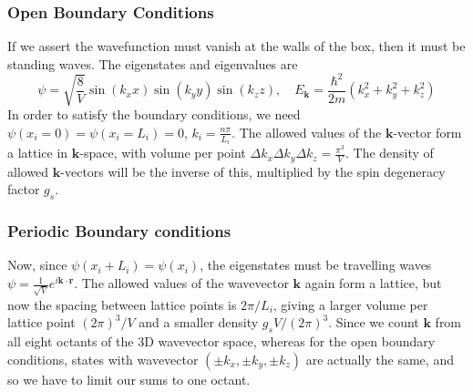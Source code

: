 \documentclass[a4paper]{article}
\theoremstyle{new}
\begin{document}
\subsubsection{Open Boundary Conditions}
If we assert the wavefunction must vanish at the walls of the box, then it must be standing waves. The eigenstates and eigenvalues are
$$\psi=\sqrt{\frac{8}{V}}\sin(k_xx)\sin(k_yy)\sin(k_zz),\quad E_{\mathbf{k}}=\frac{\hbar^2}{2m}(k_x^2+k_y^2+k_z^2)$$
In order to satisfy the boundary conditions, we need $\psi(x_i=0)=\psi(x_i=L_i)=0$, $k_i=\frac{n\pi}{L_i}$. The allowed values of the $\mathbf{k}$-vector form a lattice in $\mathbf{k}$-space, with volume per point $\Delta k_x\Delta k_y\Delta k_z=\frac{\pi^3}{V}$. The density of allowed $\mathbf{k}$-vectors will be the inverse of this, multiplied by the spin degeneracy factor $g_s$.
\subsubsection{Periodic Boundary conditions}
Now, since $\psi(x_i+L_i)=\psi(x_i)$, the eigenstates must be travelling waves $\psi=\frac{1}{\sqrt{V}}e^{i\mathbf{k}\cdot\mathbf{r}}$. The allowed values of the wavevector $\mathbf{k}$ again form a lattice, but now the spacing between lattice points is $2\pi/L_i$, giving a larger volume per lattice point $(2\pi)^3/V$ and a smaller density $g_sV/(2\pi)^3$. Since we count $\mathbf{k}$ from all eight octants of the 3D wavevector space, whereas for the open boundary conditions, states with wavevector $(\pm k_x,\pm k_y,\pm k_z)$ are actually the same, and so we have to limit our sums to one octant.
\end{document}
